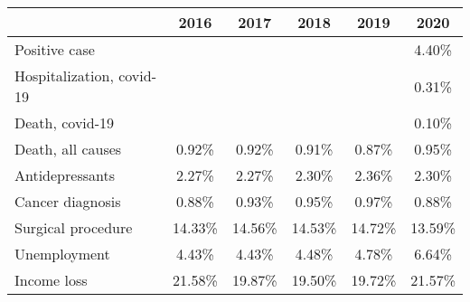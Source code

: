 
\begin{tabular}{@{}l*{5}{S[table-format={}2.2{\%}]}@{}}
\toprule
{} & {2016} & {2017} & {2018} & {2019} & {2020}\tabularnewline%
\midrule
Positive case &  &  &  &  & 4.40\%\tabularnewline%
Hospitalization, covid-19 &  &  &  &  & 0.31\%\tabularnewline%
Death, covid-19 &  &  &  &  & 0.10\%\tabularnewline%
Death, all causes & 0.92\% & 0.92\% & 0.91\% & 0.87\% & 0.95\%\tabularnewline%
Antidepressants & 2.27\% & 2.27\% & 2.30\% & 2.36\% & 2.30\%\tabularnewline%
Cancer diagnosis & 0.88\% & 0.93\% & 0.95\% & 0.97\% & 0.88\%\tabularnewline%
Surgical procedure & 14.33\% & 14.56\% & 14.53\% & 14.72\% & 13.59\%\tabularnewline%
Unemployment & 4.43\% & 4.43\% & 4.48\% & 4.78\% & 6.64\%\tabularnewline%
Income loss & 21.58\% & 19.87\% & 19.50\% & 19.72\% & 21.57\%\tabularnewline%
\bottomrule
\end{tabular}
